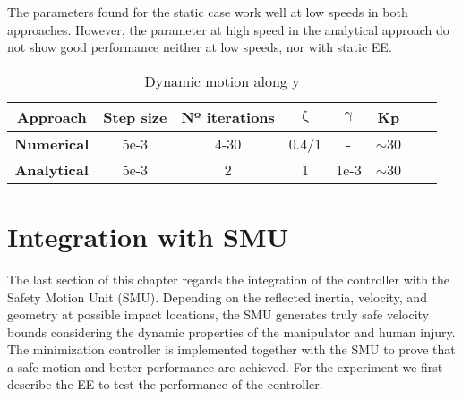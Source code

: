 The parameters found for the static case work well at low speeds in both approaches. However,  the parameter at high speed in the analytical approach do not show good performance neither at low speeds, nor with static EE.

\begin{table}[]
	\centering
	\caption{Dynamic motion along y}
	\label{table:dynamic_opt_values}
	\begin{tabular}{|c|c|c|c|c|c|c|c|}
		\hline
		\textbf{Approach}   & \textbf{Step size} & \textbf{Nº iterations} & \textbf{$\mathrm{\zeta}$}  &  \textbf{$\mathrm{\gamma}$} & \textbf{Kp}  \\ \hline
		\textbf{Numerical}  &  5e-3       & 4-30                          & 0.4/1                  & -         &  ${\sim}$30                          \\  \textbf{Analytical} &   5e-3       & 2                             &  1                  & 1e-3         & ${\sim}$30                         \\ \hline
		
               
	\end{tabular}
\end{table}




\section{Integration with SMU}

The last section of this chapter regards the integration of the controller with the Safety Motion Unit (SMU). Depending on the reflected inertia, velocity, and geometry at possible impact locations, the SMU generates truly safe velocity bounds considering the dynamic properties of the manipulator and human injury. The minimization controller is implemented together with the SMU to prove that a safe motion and better performance are achieved.
For the experiment we first describe the EE to test the performance of the controller.


